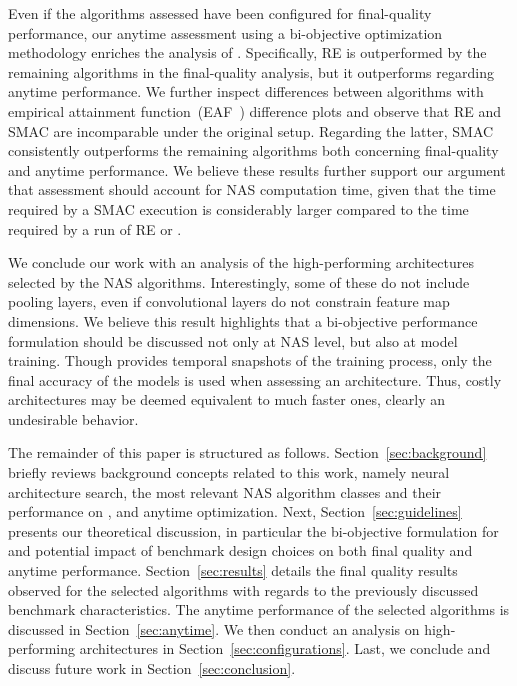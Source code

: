 Even if the algorithms assessed have been configured for final-quality performance, our anytime assessment using a bi-objective optimization methodology enriches the analysis of \nasbench. Specifically, RE is outperformed by the remaining algorithms in the final-quality analysis, but it outperforms \irace regarding anytime performance. We further inspect differences between algorithms with empirical attainment function~(EAF~\cite{LopPaqStu09emaa}) difference plots and observe that RE and SMAC are incomparable under the original \nasbench setup. %
Regarding the latter, SMAC consistently outperforms the remaining algorithms both concerning final-quality and anytime performance. We believe these results further support our argument that \nasbench assessment should account for NAS computation time, given that the time required by a SMAC execution is considerably larger compared to the time required by a run of RE or \irace.%

We conclude our work with an analysis of the high-performing architectures selected by the NAS algorithms. Interestingly, some of these do not include pooling layers, even if convolutional layers do not constrain feature map dimensions. We believe this result highlights that a bi-objective performance formulation should be discussed not only at NAS level, but also at model training. Though \nasbench provides temporal snapshots of the training process, only the final accuracy of the models is used when assessing an architecture. Thus, costly architectures may be deemed equivalent to much faster ones, clearly an undesirable behavior.

The remainder of this paper is structured as follows. Section~\ref{sec:background} briefly reviews background concepts related to this work, namely neural architecture search, the most relevant NAS algorithm classes and their performance on \nasbench, and anytime optimization. Next, Section~\ref{sec:guidelines} presents our theoretical discussion, in particular the bi-objective formulation for \nasbench and potential impact of benchmark design choices on both final quality and anytime performance. Section~\ref{sec:results} details the final quality results observed for the selected algorithms with regards to the previously discussed benchmark characteristics. The anytime performance of the selected algorithms is discussed in Section~\ref{sec:anytime}. We then conduct an analysis on high-performing architectures in Section~\ref{sec:configurations}. Last, we conclude and discuss future work in Section~\ref{sec:conclusion}.